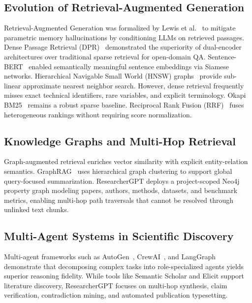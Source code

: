 \documentclass[conference]{IEEEtran}
\begin{document}

\subsection{Evolution of Retrieval-Augmented Generation}
Retrieval-Augmented Generation was formalized by Lewis et al.~\cite{lewis2020rag} to mitigate parametric memory hallucinations by conditioning LLMs on retrieved passages. Dense Passage Retrieval (DPR)~\cite{karpukhin2020dpr} demonstrated the superiority of dual-encoder architectures over traditional sparse retrieval for open-domain QA. Sentence-BERT~\cite{reimers2019sbert} enabled semantically meaningful sentence embeddings via Siamese networks. Hierarchical Navigable Small World (HNSW) graphs~\cite{malkov2020hnsw} provide sub-linear approximate nearest neighbor search. However, dense retrieval frequently misses exact technical identifiers, rare variables, and explicit terminology. Okapi BM25~\cite{robertson2009bm25} remains a robust sparse baseline. Reciprocal Rank Fusion (RRF)~\cite{cormack2009rrf} fuses heterogeneous rankings without requiring score normalization.

\subsection{Knowledge Graphs and Multi-Hop Retrieval}
Graph-augmented retrieval enriches vector similarity with explicit entity-relation semantics. GraphRAG~\cite{edge2024graphrag} uses hierarchical graph clustering to support global query-focused summarization. ResearcherGPT deploys a project-scoped Neo4j property graph modeling papers, authors, methods, datasets, and benchmark metrics, enabling multi-hop path traversals that cannot be resolved through unlinked text chunks.

\subsection{Multi-Agent Systems in Scientific Discovery}
Multi-agent frameworks such as AutoGen~\cite{wu2023autogen}, CrewAI~\cite{moura2024crewai}, and LangGraph~\cite{langgraph2024} demonstrate that decomposing complex tasks into role-specialized agents yields superior reasoning fidelity. While tools like Semantic Scholar and Elicit support literature discovery, ResearcherGPT focuses on multi-hop synthesis, claim verification, contradiction mining, and automated publication typesetting.
\end{document}
